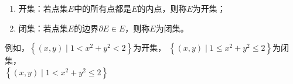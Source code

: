 \documentclass[12pt, a4paper]{article}
\numberwithin{equation}{section}
\begin{document}
    \begin{enumerate}
        \item 开集：若点集\(E\)中的所有点都是\(E\)的内点，则称\(E\)为开集；
        \item 闭集：若点集\(E\)的边界\(\partial E \in E\)，则称\(E\)为闭集。
    \end{enumerate}

    例如，\(\left\{\left(x,y\right) \mid 1 < x^2+y^2 < 2\right\}\)为开集，
    \(\left\{\left(x,y\right) \mid 1 \leq x^2+y^2 \leq 2\right\}\)为闭集，\\
    \(\left\{\left(x,y\right) \mid 1 < x^2+y^2 \leq 2\right\}\)

    \begin{figure}[htbp]
        \centering
\end{figure}
\end{document}

